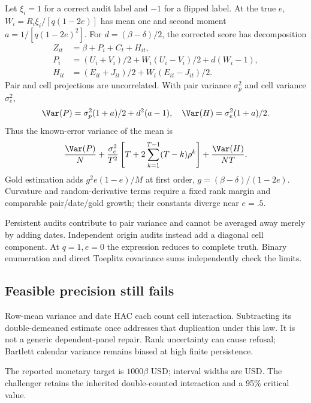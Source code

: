 Let $\xi_i=1$ for a correct audit label and $-1$ for a flipped label. At the true $e$, $W_i=R_i\xi_i/[q(1-2e)]$ has mean one and second moment $a=1/[q(1-2e)^2]$. For $d=(\beta-\delta)/2$, the corrected score has decomposition
\begin{align*}
 Z_{it}&=\beta+P_i+C_t+H_{it},\\
 P_i&=(U_i+V_i)/2+W_i(U_i-V_i)/2+d(W_i-1),\\
 H_{it}&=(E_{it}+J_{it})/2+W_i(E_{it}-J_{it})/2.
\end{align*}
Pair and cell projections are uncorrelated. With pair variance $\sigma_p^2$ and cell variance $\sigma_e^2$,
\[
 \Var(P)=\sigma_p^2(1+a)/2+d^2(a-1),\quad
 \Var(H)=\sigma_e^2(1+a)/2.
\]
Thus the known-error variance of the mean is
\[
 \frac{\Var(P)}N+\frac{\sigma_c^2}{T^2}\left[T+2\sum_{k=1}^{T-1}(T-k)\rho^k\right]+\frac{\Var(H)}{NT}.
\]
Gold estimation adds $g^2e(1-e)/M$ at first order, $g=(\beta-\delta)/(1-2e)$. Curvature and random-derivative terms require a fixed rank margin and comparable pair/date/gold growth; their constants diverge near $e=.5$.

Persistent audits contribute to pair variance and cannot be averaged away merely by adding dates. Independent origin audits instead add a diagonal cell component. At $q=1,e=0$ the expression reduces to complete truth. Binary enumeration and direct Toeplitz covariance sums independently check the limits.

\subsection{Feasible precision still fails}
Row-mean variance and date HAC each count cell interaction. Subtracting its double-demeaned estimate once addresses that duplication under this law. It is not a generic dependent-panel repair. Rank uncertainty can cause refusal; Bartlett calendar variance remains biased at high finite persistence.

The reported monetary target is $1000\beta$ USD; interval widths are USD. The challenger retains the inherited double-counted interaction and a 95\% critical value.

